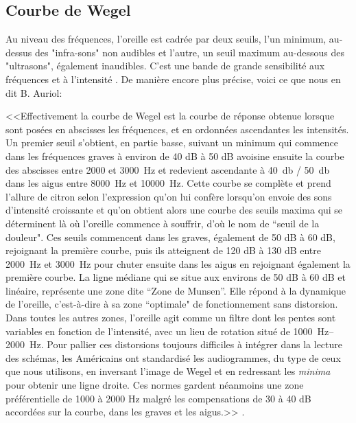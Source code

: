 \subsection{Courbe de Wegel}
\label{acoustique}

Au niveau des fréquences, l'oreille est cadrée par deux seuils,  l'un minimum, au-dessus des 
"infra-sons" non audibles et l'autre, un seuil maximum au-dessous des "ultrasons", également 
inaudibles. C'est une bande de grande sensibilité aux fréquences et à l'intensité 
\autocite{Tomatislangage}. De manière encore plus précise, voici ce que nous en dit B. Auriol:

<<Effectivement la courbe de Wegel est la courbe de réponse obtenue
lorsque sont posées en abscisses les fréquences, et en ordonnées ascendantes
les intensités. Un premier seuil s'obtient, en partie basse, suivant
un minimum qui commence dans les fréquences graves à environ de 40 dB à 50 dB
 avoisine ensuite la courbe des abscisses entre 2000 et \SI{3000}{\Hz}
et redevient ascendante à \SI{40}{\decibel} / \SI{50}{\decibel} dans les aigus entre \SI{8000}{\Hz} et
\SI{10000}{\Hz}. Cette courbe se complète et prend l'allure de citron selon
l'expression qu'on lui confère lorsqu'on envoie des
sons d'intensité croissante et qu'on obtient alors une courbe des
seuils maxima qui se déterminent là où l'oreille commence à souffrir,
d'où le nom de ``seuil de la douleur". Ces seuils
commencent dans les graves, également de 50 dB à 60 dB, rejoignant la première
courbe, puis ils atteignent de 120 dB à 130 dB entre \SI{2000}{\Hz} et \SI{3000}{\Hz} pour
chuter ensuite dans les aigus en rejoignant également la première
courbe. La ligne médiane qui se situe aux environs de 50 dB à 60 dB et linéaire, représente une zone dite 
``Zone de Munsen''. Elle répond à la dynamique de l'oreille, c'est-à-dire
à sa zone ``optimale" de fonctionnement sans
distorsion.
Dans toutes les autres zones, l'oreille
agit comme un filtre dont les pentes sont variables en fonction de
l'intensité, avec un lieu de rotation situé de \SIrange{1000}{2000}{\Hz}.
Pour pallier ces distorsions toujours difficiles à intégrer
dans la lecture des schémas, les Américains ont standardisé les audiogrammes,
du type de ceux que nous utilisons, en inversant l'image
de Wegel et en redressant les \emph{minima} pour obtenir une ligne droite.
Ces normes gardent néanmoins une zone préférentielle de 1000 à 2000 Hz malgré les compensations de 30 à 40 dB accordées sur la courbe,
dans les graves et les aigus.>> %
\autocite{auriol_stress}.

